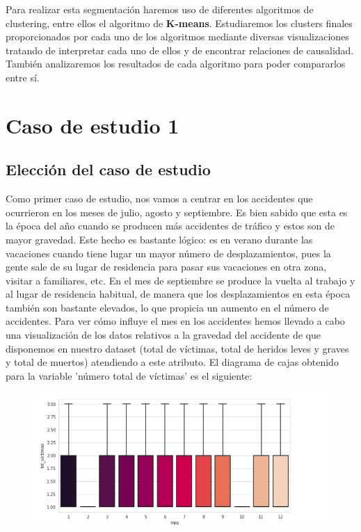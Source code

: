 \documentclass[a4paper,11pt]{book}
\begin{document}
Para realizar esta segmentación haremos uso de diferentes algoritmos de clustering, entre ellos el algoritmo de \textbf{K-means}. Estudiaremos los clusters finales proporcionados por cada uno de los algoritmos mediante diversas visualizaciones tratando de interpretar cada uno de ellos y de encontrar relaciones de causalidad. También analizaremos los resultados de cada algoritmo para poder compararlos entre sí. 

\newpage
\section{Caso de estudio 1}
\subsection{Elección del caso de estudio}
Como primer caso de estudio, nos vamos a centrar en los accidentes que ocurrieron en los meses de julio, agosto y septiembre.
Es bien sabido que esta es la época del año cuando se producen más accidentes de tráfico y estos son de mayor gravedad. Este hecho es bastante lógico: es en verano durante las vacaciones cuando tiene lugar un mayor número de desplazamientos, pues la gente sale de su lugar de residencia para pasar sus vacaciones en otra zona, visitar a familiares, etc. En el mes de septiembre se produce la vuelta al trabajo y al lugar de residencia habitual, de manera que los desplazamientos en esta época también son bastante elevados, lo que propicia un aumento en el número de accidentes. 
Para ver cómo influye el mes en los accidentes hemos llevado  a cabo una visualización de los datos relativos a la gravedad del accidente de que disponemos en nuestro dataset (total de víctimas, total de heridos leves y graves y total de muertos) atendiendo a este atributo. El diagrama de cajas obtenido para la variable 'número total de víctimas' es el siguiente:
\begin{figure}[H]
	\centering
	\includegraphics[width=1\linewidth]{img/cajas_mes}
	\caption{}
	\label{fig:cajasmes}
\end{figure}
\end{document}
